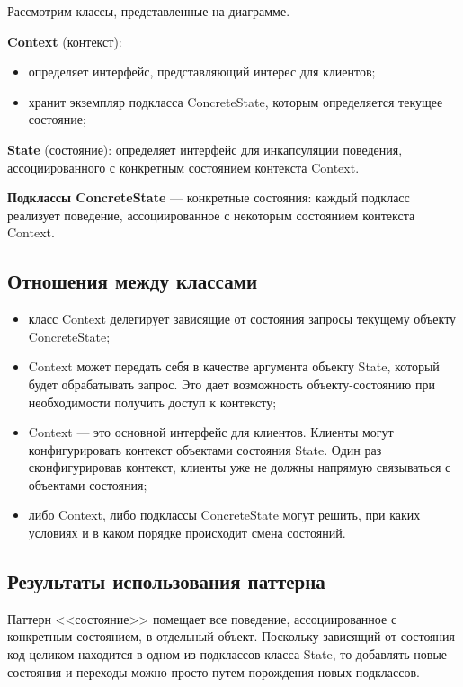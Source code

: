 Рассмотрим классы, представленные на диаграмме.

\textbf{Context }(контекст):
\begin{itemize}
\item
  определяет интерфейс, представляющий интерес для клиентов;
\item
  хранит экземпляр подкласса ConcreteState, которым определяется
  текущее состояние;
\end{itemize}

\textbf{State }(состояние):
определяет интерфейс для инкапсуляции поведения, ассоциированного
с конкретным состоянием контекста Context.

\textbf{Подклассы ConcreteState } --- конкретные состояния:
каждый подкласс реализует поведение, ассоциированное с некоторым 
состоянием контекста Context.

\subsection{Отношения между классами}

\begin{itemize}
\item
  класс Context делегирует зависящие от состояния запросы текущему
  объекту ConcreteState;

\item
  Context может передать себя в качестве аргумента объекту State, который
  будет обрабатывать запрос. Это дает возможность объекту-состоянию
  при необходимости получить доступ к контексту;

\item
  Context --- это основной интерфейс для клиентов. Клиенты могут конфигурировать
  контекст объектами состояния State. Один раз сконфигурировав
  контекст, клиенты уже не должны напрямую связываться с объектами
  состояния;

\item
  либо Context, либо подклассы ConcreteState могут решить, при каких
  условиях и в каком порядке происходит смена состояний.
\end{itemize}


\subsection{Результаты использования паттерна}

Паттерн <<состояние>> помещает все поведение, ассоциированное с конкретным
состоянием, в отдельный объект. Поскольку зависящий от состояния код
целиком находится в одном из подклассов класса State, то добавлять
новые состояния и переходы можно просто путем порождения новых подклассов.

